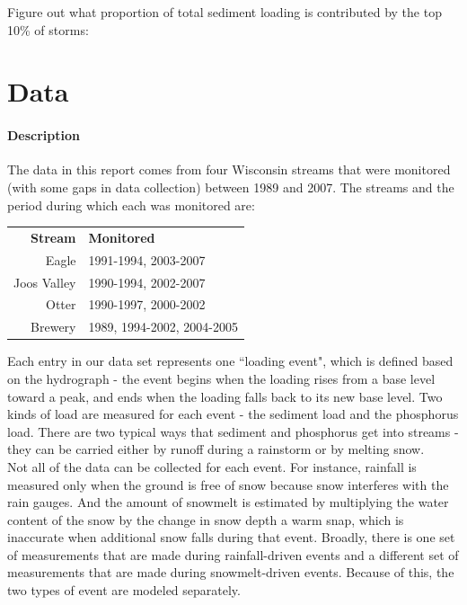 \documentclass[12pt]{article}
\begin{document}
Figure out what proportion of total sediment loading is contributed by the top 10\% of storms:\\








\section{Data}

\paragraph{Description}
The data in this report comes from four Wisconsin streams that were monitored (with some gaps in data collection) between 1989 and 2007. The streams and the period during which each was monitored are:

\begin{table}[h]
    \begin{tabular}{r l}
        \textbf{Stream} & \textbf{Monitored} \\
        Eagle & 1991-1994, 2003-2007\\
        Joos Valley & 1990-1994, 2002-2007\\
        Otter & 1990-1997, 2000-2002\\
        Brewery & 1989, 1994-2002, 2004-2005\\
    \end{tabular}
\end{table}

Each entry in our data set represents one ``loading event", which is defined based on the hydrograph - the event begins when the loading rises from a base level toward a peak, and ends when the loading falls back to its new base level. Two kinds of load are measured for each event - the sediment load and the phosphorus load. There are two typical ways that sediment and phosphorus get into streams - they can be carried either by runoff during a rainstorm or by melting snow.\\

Not all of the data can be collected for each event. For instance, rainfall is measured only when the ground is free of snow because snow interferes with the rain gauges. And the amount of snowmelt is estimated by multiplying the water content of the snow by the change in snow depth a warm snap, which is inaccurate when additional snow falls during that event. Broadly, there is one set of measurements that are made during rainfall-driven events and a different set of measurements that are made during snowmelt-driven events. Because of this, the two types of event are modeled separately.\\
\end{document}
